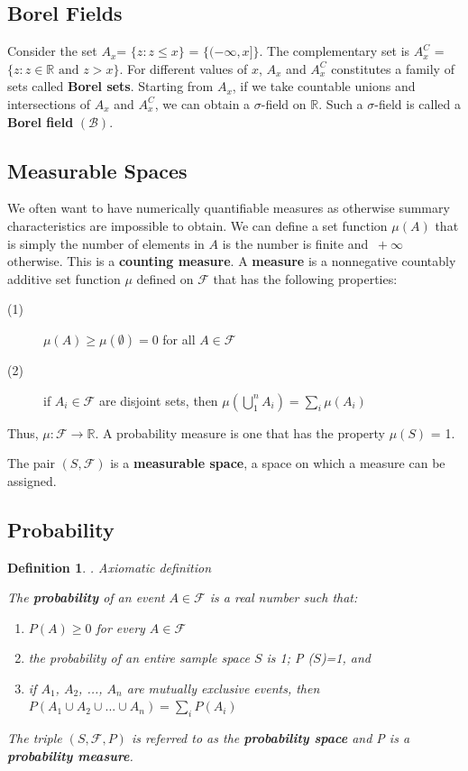 \documentclass{article}
\newtheorem{definition}{Definition}[section]
\begin{document}
\subsection{Borel Fields}

Consider the set \(A_x\)= $\{z:z \leq x\}$ = $\{(-\infty, x]\}$. The complementary set is \(A_x^C\) = $\{z : z \in \mathbb{R} \text{ and } z > x\}$. For different values of $x$, \(A_x\) and \(A_x^C\) constitutes a family of sets called \textbf{Borel sets}. Starting from \(A_x\), if we take countable unions and intersections of \(A_x\) and \(A_x^C\), we can obtain a $\sigma$-field on $\mathbb{R}$. Such a $\sigma$-field is called a \textbf{Borel field} $(\mathcal{B})$.

\subsection{Measurable Spaces}

We often want to have numerically quantifiable measures as otherwise summary characteristics are impossible to obtain. We can define a set function $\mu$\((A)\) that is simply the number of elements in \(A\) is the number is finite and $\ + \infty$ otherwise. This is a \textbf{counting measure}. A \textbf{measure} is a nonnegative countably additive set function $\mu$ defined on $\mathcal{F}$ that has the following properties:
\begin{description}
    \item[(1)] $\mu(A) \geq \mu(\emptyset) = 0$ for all $A \in \mathcal{F}$
    \item[(2)] if \(A_i \in \mathcal{F}\) are disjoint sets, then $ \mu (\bigcup_{1}^{n} A_i) = \sum_i \mu (A_i) $
\end{description}

Thus, $ \mu : \mathcal{F} \rightarrow \mathbb{R} $. A probability measure is one that has the property $\mu (S)$ = 1.

The pair $ (S, \mathcal{F})$ is a \textbf{measurable space}, a space on which a measure can be assigned.

\subsection{Probability}

\begin{definition}. 
Axiomatic definition

The \textbf{probability} of an event \(A \in \mathcal{F}\) is a real number such that:
    \begin{enumerate}
        \item [1.] $P(A) \geq 0$ for every \(A \in \mathcal{F}\)
        \item [2.] the probability of an entire sample space \(S\) is 1; P (\(S\))=1, and
        \item[3.] if \(A_1\), \(A_2\), ..., \(A_n\) are mutually exclusive events, then \( P(A_1 \cup A_2 \cup ... \cup A_n) = \sum_i P(A_i) \)
    \end{enumerate}
The triple \((S, \mathcal{F}, P)\) is referred to as the \textbf{probability space} and P is a \textbf{probability measure}.
   
\end{definition}
\end{document}
